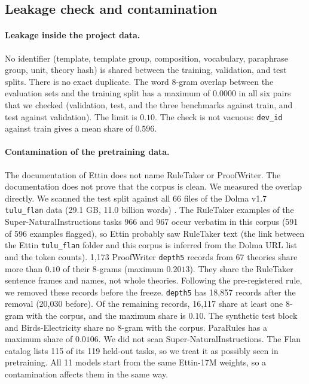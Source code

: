 \documentclass[11pt,a4paper]{article}
\begin{document}
\subsection{Leakage check and contamination}

\paragraph{Leakage inside the project data.}
No identifier (template, template group, composition, vocabulary, paraphrase group, unit, theory hash) is shared between the training, validation, and test splits.
There is no exact duplicate.
The word 8-gram overlap between the evaluation sets and the training split has a maximum of $0.0000$ in all six pairs that we checked (validation, test, and the three benchmarks against train, and test against validation).
The limit is $0.10$.
The check is not vacuous: \texttt{dev\_id} against train gives a mean share of $0.596$.

\paragraph{Contamination of the pretraining data.}
The documentation of Ettin does not name RuleTaker or ProofWriter.
The documentation does not prove that the corpus is clean.
We measured the overlap directly.
We scanned the test split against all 66 files of the Dolma v1.7 \texttt{tulu\_flan} data (29.1 GB, 11.0 billion words) \cite{soldaini2024}.
The RuleTaker examples of the Super-NaturalInstructions tasks 966 and 967 occur verbatim in this corpus (591 of 596 examples flagged), so Ettin probably saw RuleTaker text (the link between the Ettin \texttt{tulu\_flan} folder and this corpus is inferred from the Dolma URL list and the token counts).
1{,}173 ProofWriter \texttt{depth5} records from 67 theories share more than $0.10$ of their 8-grams (maximum $0.2013$).
They share the RuleTaker sentence frames and names, not whole theories.
Following the pre-registered rule, we removed these records before the freeze.
\texttt{depth5} has 18{,}857 records after the removal (20{,}030 before).
Of the remaining records, 16{,}117 share at least one 8-gram with the corpus, and the maximum share is $0.10$.
The synthetic test block and Birds-Electricity share no 8-gram with the corpus.
ParaRules has a maximum share of $0.0106$.
We did not scan Super-NaturalInstructions.
The Flan catalog lists 115 of its 119 held-out tasks, so we treat it as possibly seen in pretraining.
All 11 models start from the same Ettin-17M weights, so a contamination affects them in the same way.
\end{document}
